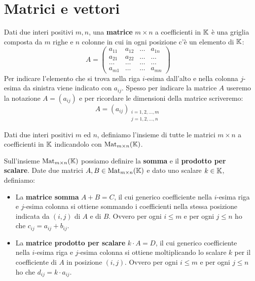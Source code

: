 \section{Matrici e vettori}

\begin{definition}
	Dati due interi positivi $m, n$, una \textbf{matrice} $m \times n$ a coefficienti in $\mathbb{K}$ è una
	griglia composta da $m$ righe e $n$ colonne in cui in ogni posizione c'è un elemento di $\mathbb{K}$:
	\[
		A = \begin{pmatrix}
			a_{11} & a_{12} & \dots & a_{1n} \\
			a_{21} & a_{22} & \dots & \dots  \\
			\dots  & \dots  & \dots & \dots  \\
			a_{m1} & \dots  & \dots & a_{mn}
		\end{pmatrix}
	\]
	Per indicare l'elemento che si trova nella riga $i$-esima dall'alto e nella colonna $j$-esima da sinistra
	viene indicato con $a_{ij}$. Spesso per indicare la matrice $A$ useremo la notazione $A = (a_{ij})$ e per
	ricordare le dimensioni della matrice scriveremo:
	\[
		A = (a_{ij})_{\substack{
					i = 1, 2, \dots, m \\
					j = 1, 2, \dots, n}}
	\]
\end{definition}

\begin{definition}
	Dati due interi positivi $m$ ed $n$, definiamo l'insieme di tutte le matrici $m \times n$ a
	coefficienti in $\mathbb{K}$ indicandolo con $\operatorname{Mat}_{m \times n} (\mathbb{K})$.
\end{definition}

\begin{definition}
	Sull'insieme $\operatorname{Mat}_{m \times n} (\mathbb{K})$ possiamo definire la \textbf{somma} e il
	\textbf{prodotto per scalare}. Date due matrici $A, B \in \operatorname{Mat}_{m \times n} (\mathbb{K})$ e dato uno scalare
	$k \in \mathbb{K}$, definiamo:
	\begin{itemize}
		\item La \textbf{matrice somma} $A + B = C$, il cui generico coefficiente nella $i$-esima riga e
		      $j$-esima colonna si ottiene sommando i coefficienti nella stessa posizione indicata da $(i, j)$
		      di $A$ e di $B$. Ovvero per ogni $i \leq m$ e per ogni $j \leq n$ ho che $c_{ij} = a_{ij} + b_{ij}$.
		\item La \textbf{matrice prodotto per scalare} $k \cdot A = D$, il cui generico coefficiente nella
		      $i$-esima riga e $j$-esima colonna si ottiene moltiplicando lo scalare $k$ per il coefficiente
		      di $A$ in posizione $(i, j)$. Ovvero per ogni $i \leq m$ e per ogni $j \leq n$ ho che
		      $d_{ij} = k \cdot a_{ij}$.
	\end{itemize}
\end{definition}

